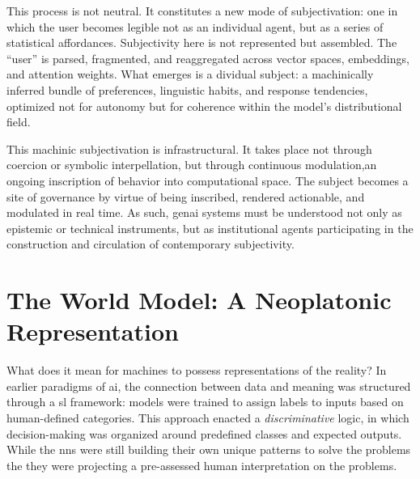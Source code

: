 This process is not neutral. It constitutes a new mode of subjectivation: one in which the user becomes legible not as an individual agent, but as a series of statistical affordances. Subjectivity here is not represented but assembled. The “user” is parsed, fragmented, and reaggregated across vector spaces, embeddings, and attention weights. What emerges is a dividual subject: a machinically inferred bundle of preferences, linguistic habits, and response tendencies, optimized not for autonomy but for coherence within the model's distributional field.

This machinic subjectivation is infrastructural. It takes place not through coercion or symbolic interpellation, but through continuous modulation,an ongoing inscription of behavior into computational space. The subject becomes a site of governance by virtue of being inscribed, rendered actionable, and modulated in real time. As such, \gls{genai} systems must be understood not only as epistemic or technical instruments, but as institutional agents participating in the construction and circulation of contemporary subjectivity.

\section{The World Model: A Neoplatonic Representation}




What does it mean for machines to possess representations of the reality? In earlier paradigms of \gls{ai}, the connection between data and meaning was structured through a \gls{sl} framework: models were trained to assign labels to inputs based on human-defined categories. This approach enacted a \textit{discriminative} logic, in which decision-making was organized around predefined classes and expected outputs. While the \glspl{nn} were still building their own unique patterns to solve the problems the they were projecting a pre-assessed human interpretation on the problems.

